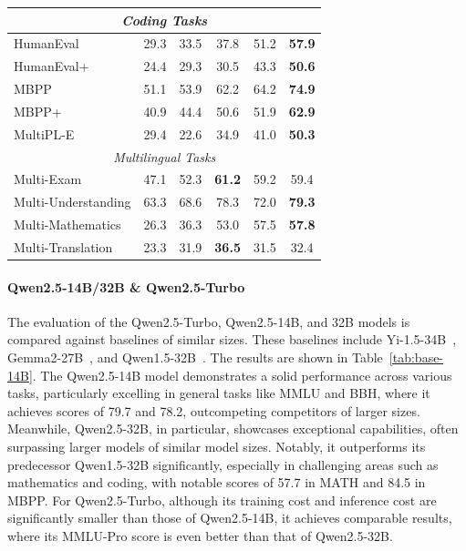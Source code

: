 \documentclass{article}
\begin{document}
\begin{table}[tbp]
\begin{tabular}{@{}lccccc@{}}
\midrule
\multicolumn{6}{c}{\textit{Coding Tasks}} \\
\midrule
HumanEval & 29.3 & 33.5 & 37.8 & 51.2 & \textbf{57.9} \\
HumanEval+ & 24.4 & 29.3 & 30.5 & 43.3 & \textbf{50.6} \\
MBPP & 51.1 & 53.9 & 62.2 & 64.2 & \textbf{74.9} \\
MBPP+ & 40.9 & 44.4 & 50.6 & 51.9 & \textbf{62.9} \\
MultiPL-E & 29.4 & 22.6 & 34.9 & 41.0 & \textbf{50.3} \\
\midrule
\multicolumn{6}{c}{\textit{Multilingual Tasks}} \\
\midrule
Multi-Exam & 47.1 & 52.3 & \textbf{61.2} & 59.2 & 59.4 \\
Multi-Understanding & 63.3 & 68.6 & 78.3 & 72.0 & \textbf{79.3} \\
Multi-Mathematics & 26.3 & 36.3 & 53.0 & 57.5 & \textbf{57.8} \\
Multi-Translation & 23.3 & 31.9 & \textbf{36.5} & 31.5 & 32.4 \\
\bottomrule
\end{tabular}
\end{table}

\paragraph{Qwen2.5-14B/32B \& Qwen2.5-Turbo}
The evaluation of the Qwen2.5-Turbo, Qwen2.5-14B, and 32B models is compared against baselines of similar sizes. 
These baselines include Yi-1.5-34B~\citep{yi}, Gemma2-27B~\citep{gemma2}, and Qwen1.5-32B~\citep{qwen1.5}.
The results are shown in Table~\ref{tab:base-14B}.
The Qwen2.5-14B model demonstrates a solid performance across various tasks, particularly excelling in general tasks like MMLU and BBH, where it achieves scores of 79.7 and 78.2, outcompeting competitors of larger sizes. Meanwhile, Qwen2.5-32B, in particular, showcases exceptional capabilities, often surpassing larger models of similar model sizes. Notably, it outperforms its predecessor Qwen1.5-32B significantly, especially in challenging areas such as mathematics and coding, with notable scores of 57.7 in MATH and 84.5 in MBPP. For Qwen2.5-Turbo, although its training cost and inference cost are significantly smaller than those of Qwen2.5-14B, it achieves comparable results, where its MMLU-Pro score is even better than that of Qwen2.5-32B.
\end{document}
